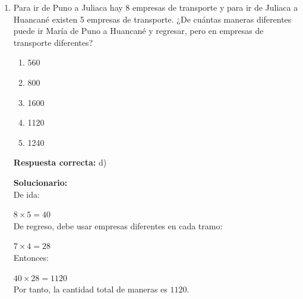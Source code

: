 \begin{enumerate}
\begin{center}
\end{center}


\vspace{6mm}
	
	\item Para ir de Puno a Juliaca hay 8 empresas de transporte y para ir de Juliaca a Huancané existen 5 empresas de transporte. ¿De cuántas maneras diferentes puede ir María de Puno a Huancané y regresar, pero en empresas de transporte diferentes?
	\begin{enumerate}[label=\alph*)]
		\item 560
		\item 800
		\item 1600
		\item 1120
		\item 1240
	\end{enumerate}
	\textbf{Respuesta correcta:} d)
	
	\vspace{2mm}
	\textbf{Solucionario:}\\
	De ida:
	
	$8 \times 5 = 40$\\
	
	De regreso, debe usar empresas diferentes en cada tramo:
	
	$7 \times 4 = 28$\\
	
	Entonces:
	
	$40 \times 28 = 1120$\\
	
	Por tanto, la cantidad total de maneras es \(\boxed{1120}\).
	
	\vspace{6mm}
	

\end{enumerate}
